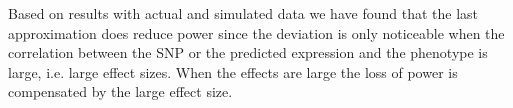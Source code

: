 \documentclass[10pt]{article}
\begin{document}



Based on results with actual and simulated data we have found that the last approximation does reduce power since the deviation is only noticeable when the correlation between the SNP or the predicted expression and the phenotype is large, i.e. large effect sizes. When the effects are large the loss of power is compensated by the large effect size.
%
%
%



%
%
%
%
%
%
%
%
\end{document}

